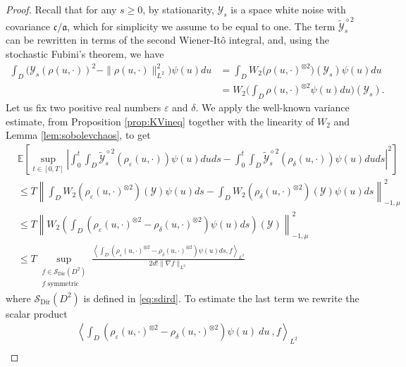 \documentclass[a4paper, reqno, 12pt]{amsart}
\theoremstyle{plain}
\theoremstyle{definition}
\newcommand{\Sdir}{\mathcal{S}_{\text{Dir}}}
\begin{document}
\begin{proof}
 Recall that for any $s\ge 0$, by stationarity, $\mathcal Y_s$ is a space white noise with covariance $\mathfrak c / \mathfrak a$, which for simplicity we assume to be equal to one. The term $\tilde{\mathcal{Y}}_s^{\diamond 2}$  can be rewritten in terms of the second Wiener-It\^o integral, and, using the stochastic Fubini's theorem,  we have
    \begin{align*}
        \int_{D} \big(\mathcal{Y}_s (\rho(u,\cdot))^2 -\|\rho(u,\cdot)\|^2_{L^2}\big) \psi(u) du &= \int_{D} W_2\big(\rho(u,\cdot)^{\otimes 2}\big)(\mathcal Y_s)\psi(u) du \\
        & = W_2\bigg(\int_{D} \rho(u,\cdot)^{\otimes 2}\psi(u) du \bigg)(\mathcal Y_s).
    \end{align*}
 Let us fix two positive real numbers $\varepsilon$ and $\delta$. We apply the well-known variance estimate, from Proposition \ref{prop:KVineq} together with the linearity of $W_2$ and Lemma \ref{lem:sobolevchaos}, to get 
    \begin{align}
    \label{eq:dualityburgers}
        &\mathbb E\left[\sup_{t\in[0,T]} \left| \int_0^t\int_{D}\tilde{\mathcal{Y}}^{\diamond 2}_s(\rho_{\varepsilon}(u,\cdot))\psi(u) du ds - \int_0^t\int_{D}\tilde{\mathcal{Y}}^{\diamond 2}_s(\rho_\delta (u,\cdot))\psi(u) du ds \right|^2\right] \nonumber\\
        &\leq T \left\|\int_{D}W_2\left( \rho_{\varepsilon}(u,\cdot)^{\otimes 2} \right)(\mathcal{Y})\psi(u) ds - \int_{D}W_2\left( \rho_\delta(u,\cdot)^{\otimes 2} \right)(\mathcal{Y}) \psi(u) ds\right\|_{-1,\mu}^2 \nonumber \\
        &\leq T \left\|W_2\left( \int_{D} \left(\rho_{\varepsilon}(u,\cdot)^{\otimes 2}- \rho_\delta(u,\cdot)^{\otimes 2}\right) \psi(u) ds\right)(\mathcal{Y} ) \right\|_{-1,\mu}^2 \nonumber \\
        &\leq T \sup_{\substack{f\in \Sdir(D^2)\\  f \text{  symmetric }}}\frac{\left\langle \int_{D} \left(\rho_{\varepsilon}(u,\cdot)^{\otimes 2}- \rho_\delta (u,\cdot)^{\otimes 2} \right) \psi(u) ds,f\right\rangle_{L^2} }{2d!\|\nabla f\|_{L^2}}
    \end{align}    
where $\Sdir (D^2)$ is defined in \eqref{eq:sdird}.  To estimate the last term we rewrite the scalar product
    \begin{equation}
      \begin{split}
        &\left\langle \int_{D} (\rho_{\varepsilon}(u,\cdot)^{\otimes 2} - \rho_\delta(u,\cdot)^{\otimes 2})\psi(u)\  du \ , f \right\rangle_{L^2} \\

\end{split}
\end{equation}
\end{proof}
\end{document}
